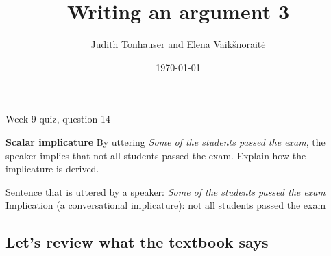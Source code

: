 \documentclass[a4,11pt]{article}
\title{Writing an argument 3}
\author{Judith Tonhauser and Elena Vaik\v snorait\.{e} }
\date{\today}
\begin{document}
\maketitle

Week 9 quiz, question 14

{ \bf  Scalar implicature} By uttering {\it Some of the students passed the exam}, the speaker implies that not all students passed the exam. Explain how the implicature is derived.

Sentence that is uttered by a speaker: {\it Some of the students passed the exam}
\\ Implication (a conversational implicature): not all students passed the exam



\subsection*{Let's review what the textbook says}
\end{document}

